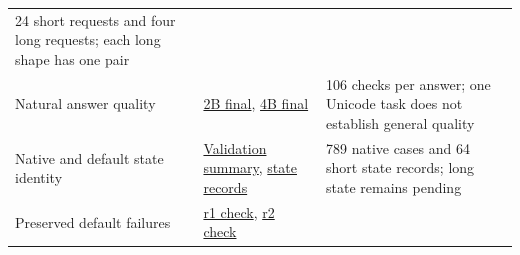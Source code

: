 \documentclass[10pt,a4paper]{article}
\begin{document}
\begin{longtable}[]{@{}lll@{}}
\begin{minipage}[t]{0.30\columnwidth}
24 short requests and four long requests; each long shape has one
pair\strut
\end{minipage}\tabularnewline
\begin{minipage}[t]{0.30\columnwidth}\raggedright
Natural answer quality\strut
\end{minipage} & \begin{minipage}[t]{0.30\columnwidth}\raggedright
\href{https://github.com/MoyaMryia/riscv-accl/blob/main/spacemit/reports/raw/k1-final-default-20261014-r3/comparison-r3/answer-2B-final/answer.json}{2B
final},
\href{https://github.com/MoyaMryia/riscv-accl/blob/main/spacemit/reports/raw/k1-final-default-20261014-r3/comparison-r3/answer-4B-final/answer.json}{4B
final}\strut
\end{minipage} & \begin{minipage}[t]{0.30\columnwidth}\raggedright
106 checks per answer; one Unicode task does not establish general
quality\strut
\end{minipage}\tabularnewline
\begin{minipage}[t]{0.30\columnwidth}\raggedright
Native and default state identity\strut
\end{minipage} & \begin{minipage}[t]{0.30\columnwidth}\raggedright
\href{https://github.com/MoyaMryia/riscv-accl/blob/main/spacemit/reports/raw/k1-final-default-20261014-r3/final-validation-r3/summary.json}{Validation
summary},
\href{https://github.com/MoyaMryia/riscv-accl/blob/main/spacemit/reports/raw/k1-final-default-20261014-r3/final-validation-r3/state.json}{state
records}\strut
\end{minipage} & \begin{minipage}[t]{0.30\columnwidth}\raggedright
789 native cases and 64 short state records; long state remains
pending\strut
\end{minipage}\tabularnewline
\begin{minipage}[t]{0.30\columnwidth}\raggedright
Preserved default failures\strut
\end{minipage} & \begin{minipage}[t]{0.30\columnwidth}\raggedright
\href{https://github.com/MoyaMryia/riscv-accl/blob/main/spacemit/reports/raw/k1-final-default-20261014-r3/r1-failure-verification.json}{r1
check},
\href{https://github.com/MoyaMryia/riscv-accl/blob/main/spacemit/reports/raw/k1-final-default-20261014-r3/r2-failure-verification.json}{r2
check}\strut
\end{minipage} & \begin{minipage}[t]{0.30\columnwidth}\raggedright

\end{minipage}
\end{longtable}
\end{document}
